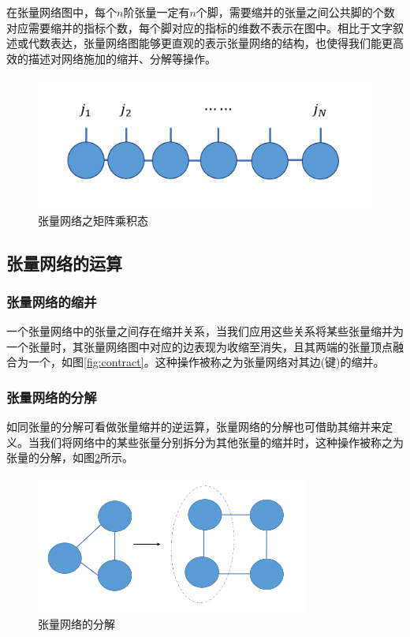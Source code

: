 在张量网络图中，每个$n$阶张量一定有$n$个脚，需要缩并的张量之间公共脚的个数对应需要缩并的指标个数，每个脚对应的指标的维数不表示在图中。相比于文字叙述或代数表达，张量网络图能够更直观的表示张量网络的结构，也使得我们能更高效的描述对网络施加的缩并、分解等操作。

\begin{figure}[htb]
	\centering
	\includegraphics[width=1\textwidth]{image/smallTensors.png}
	\caption{张量网络之矩阵乘积态}
	\label{fig:MPS}
\end{figure}

\subsection{张量网络的运算}

\subsubsection{张量网络的缩并}

一个张量网络中的张量之间存在缩并关系，当我们应用这些关系将某些张量缩并为一个张量时，其张量网络图中对应的边表现为收缩至消失，且其两端的张量顶点融合为一个，如图\ref{fig:contract}。这种操作被称之为张量网络对其边(键)的缩并。

\subsubsection{张量网络的分解}

如同张量的分解可看做张量缩并的逆运算，张量网络的分解也可借助其缩并来定义。当我们将网络中的某些张量分别拆分为其他张量的缩并时，这种操作被称之为张量的分解，如图\ref{fig:decp}所示。

\begin{figure}[htb]
	\centering
	\includegraphics[width=0.8\textwidth]{image/decomposition.png}
	\caption{张量网络的分解}
	\label{fig:decp}
\end{figure}

